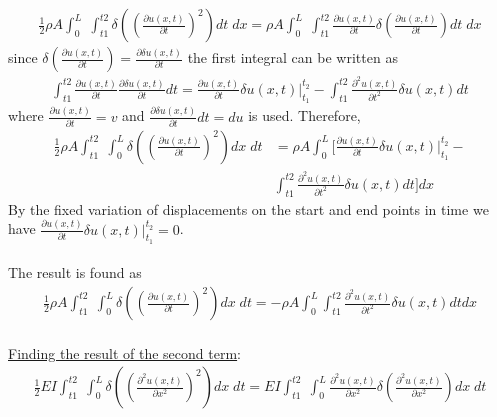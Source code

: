 \documentclass[]{report}
\begin{document}
\begin{eqnarray*}
\frac{1}{2} \rho A \int_{0}^{L}\;  \int_{t1}^{t2}  \delta\left( {\left(\frac{\partial{ u\left(x,t\right)}}{\partial{t}}\right)}^2 \right) dt\;  dx =\rho A \int_{0}^{L}\;  \int_{t1}^{t2} \frac{\partial{ u\left(x,t\right)}}{\partial{t}} \delta {\left(\frac{\partial{ u\left(x,t\right)}}{\partial{t}}\right)}  dt\;  dx
\end{eqnarray*}
since $\delta \left(\frac{\partial{u \left(x,t\right)}}{\partial{t}}\right)=\frac{\partial{\delta u\left(x,t\right)}}{\partial t}$ the first integral can be written as
\begin{eqnarray*}
\int_{t1}^{t2} \frac{\partial{ u\left(x,t\right)}}{\partial{t}}\frac{\partial{\delta u\left(x,t\right)}}{\partial t}  dt=\frac{\partial{ u\left(x,t\right)}}{\partial{t}} \delta u\left(x,t\right) {|}_{t_1}^{t_2}-\int_{t1}^{t2} \frac{\partial^2{ u\left(x,t\right)}}{\partial{t^2}}\delta u\left(x,t\right)dt
\end{eqnarray*}
where $\frac{\partial{ u\left(x,t\right)}}{\partial{t}}=v$ and $\frac{\partial{ \delta u\left(x,t\right)}}{\partial{t}}dt=du$ is used. Therefore,
\begin{equation*}
\begin{split}
\frac{1}{2}\rho A \int_{t1}^{t2} \; \int_{0}^{L} \delta\left( {\left(\frac{\partial{ u\left(x,t\right)}}{\partial{t}}\right)}^2 \right) dx \; dt&= \rho A \int_{0}^{L}\biggl[\frac{\partial{ u\left(x,t\right)}}{\partial{t}} \delta u\left(x,t\right) {|}_{t_1}^{t_2}-\\
&\int_{t1}^{t2} \frac{\partial^2{ u\left(x,t\right)}}{\partial{t^2}}\delta u\left(x,t\right)dt\biggr]dx
 \end{split}
\end{equation*}
By the fixed variation of displacements on the start and end points in time we have $\frac{\partial{ u\left(x,t\right)}}{\partial{t}} \delta u\left(x,t\right) {|}_{t_1}^{t_2}=0$. \\
\\
The result is found as
\begin{eqnarray*}
\frac{1}{2}\rho A \int_{t1}^{t2} \; \int_{0}^{L} \delta\left( {\left(\frac{\partial{ u\left(x,t\right)}}{\partial{t}}\right)}^2 \right) dx \; dt=-\rho A \int_{0}^{L}\int_{t1}^{t2} \frac{\partial^2{ u\left(x,t\right)}}{\partial{t^2}}\delta u\left(x,t\right)dt dx
\end{eqnarray*}
\\
\underline{Finding the result of the second term}:\
\\
\begin{eqnarray*}
\frac{1}{2}E I \int_{t1}^{t2} \;\int_{0}^{L}  \delta\left( {\left(\frac{\partial^2{u\left(x,t\right)}}{\partial{x^2}}\right)}^2\right) dx\; dt= E I \int_{t1}^{t2} \;\int_{0}^{L}   \frac{\partial^2{u\left(x,t\right)}}{\partial{x^2}} \delta{\left(\frac{\partial^2{u\left(x,t\right)}}{\partial{x^2}}\right)} dx\; dt
\end{eqnarray*}
\end{document}
